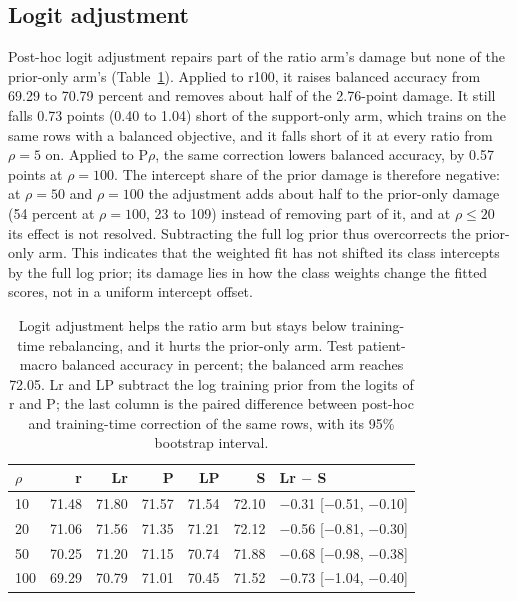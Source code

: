 \subsection{Logit adjustment}
\label{sec:adjustment-results}
Post-hoc logit adjustment repairs part of the ratio arm's damage but none of the prior-only arm's (Table~\ref{tab:adjustment}). Applied to r100, it raises balanced accuracy from 69.29 to 70.79 percent and removes about half of the 2.76-point damage. It still falls 0.73 points (0.40 to 1.04) short of the support-only arm, which trains on the same rows with a balanced objective, and it falls short of it at every ratio from $\rho=5$ on. Applied to P$\rho$, the same correction lowers balanced accuracy, by 0.57 points at $\rho=100$. The intercept share of the prior damage is therefore negative: at $\rho=50$ and $\rho=100$ the adjustment adds about half to the prior-only damage (54 percent at $\rho=100$, 23 to 109) instead of removing part of it, and at $\rho\leq20$ its effect is not resolved. Subtracting the full log prior thus overcorrects the prior-only arm. This indicates that the weighted fit has not shifted its class intercepts by the full log prior; its damage lies in how the class weights change the fitted scores, not in a uniform intercept offset.

\begin{table}[htbp]
\centering
\renewcommand{\arraystretch}{1.15}
\begin{tabular}{@{}lrrrrrl@{}}
\toprule
$\rho$ & r & Lr & P & LP & S & Lr $-$ S \\
\midrule
10 & 71.48 & 71.80 & 71.57 & 71.54 & 72.10 & $-$0.31 [$-$0.51, $-$0.10] \\
20 & 71.06 & 71.56 & 71.35 & 71.21 & 72.12 & $-$0.56 [$-$0.81, $-$0.30] \\
50 & 70.25 & 71.20 & 71.15 & 70.74 & 71.88 & $-$0.68 [$-$0.98, $-$0.38] \\
100 & 69.29 & 70.79 & 71.01 & 70.45 & 71.52 & $-$0.73 [$-$1.04, $-$0.40] \\
\bottomrule
\end{tabular}
\caption{Logit adjustment helps the ratio arm but stays below training-time rebalancing, and it hurts the prior-only arm. Test patient-macro balanced accuracy in percent; the balanced arm reaches 72.05. Lr and LP subtract the log training prior from the logits of r and P; the last column is the paired difference between post-hoc and training-time correction of the same rows, with its 95\% bootstrap interval.}
\label{tab:adjustment}
\end{table}


